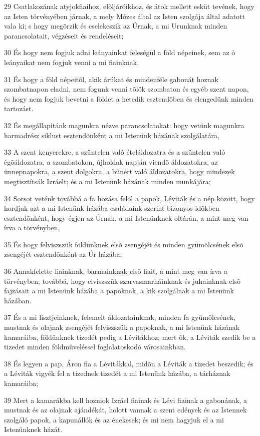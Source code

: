 \par 29 Csatlakozának atyjokfiaihoz, elõljáróikhoz, és átok mellett esküt tevének, hogy az Isten törvényében járnak, a mely Mózes által az Isten szolgája által adatott vala ki; s hogy megõrzik és cselekeszik az Úrnak, a mi Urunknak minden parancsolatait, végzéseit és rendeléseit;
\par 30 És hogy nem fogjuk adni leányainkat feleségül a föld népeinek, sem az õ leányaikat nem fogjuk venni a mi fiainknak,
\par 31 És hogy a föld népeitõl, akik árúkat és mindenféle gabonát hoznak szombatnapon eladni, nem fogunk venni tõlök szombaton és egyéb szent napon, és hogy nem fogjuk bevetni a  földet a hetedik esztendõben és elengedünk minden tartozást.
\par 32 És megállapítánk magunkra nézve parancsolatokat: hogy vetünk magunkra harmadrész siklust esztendõnként a mi Istenünk házának szolgálatára,
\par 33 A szent kenyerekre, a szüntelen való ételáldozatra és a szüntelen való égõáldozatra, a szombatokon, újholdak napján viendõ áldozatokra, az ünnepnapokra, a szent dolgokra, a bûnért való áldozatokra, hogy mindezek megtisztítsák Izráelt; és a mi Istenünk házának minden munkájára;
\par 34 Sorsot veténk továbbá a fa hozása felõl a papok, Léviták és a nép között, hogy hordjuk azt a mi Istenünk házába családaink szerint bizonyos idõkben esztendõnként, hogy égjen az Úrnak, a mi Istenünknek oltárán, a mint meg van írva a törvényben,
\par 35 És hogy felviszszük földünknek elsõ zsengéjét és minden gyümölcsének elsõ zsengéjét esztendõnként az Úr házába;
\par 36 Annakfelette fiainknak, barmainknak elsõ fiait, a mint meg van írva a törvényben; továbbá, hogy elviszszük szarvasmarháinknak és juhainknak elsõ fajzásait a mi Istenünk házába a papoknak, a kik szolgálnak a mi Istenünk házában.
\par 37 És a mi lisztjeinknek, felemelt áldozatainknak, minden fa gyümölcsének, mustnak és olajnak zsengéjét felviszszük a papoknak, a mi Istenünk házának kamaráiba, földünknek tizedét pedig a Lévitákhoz; mert õk, a Léviták szedik be a  tizedet minden földmûveléssel foglalatoskodó városainkban.
\par 38 És legyen a pap, Áron fia a Lévitákkal, midõn a Léviták a tizedet beszedik; és a Léviták vigyék fel a tizednek tizedét a mi Istenünk házába, a tárháznak kamaráiba;
\par 39 Mert a kamarákba kell hozniok Izráel fiainak és Lévi fiainak a gabonának, a mustnak és az olajnak ajándékát, holott vannak a szent edények és az Istennek szolgáló papok, a kapunállók és az énekesek; és mi nem hagyjuk el a mi Istenünknek házát.

